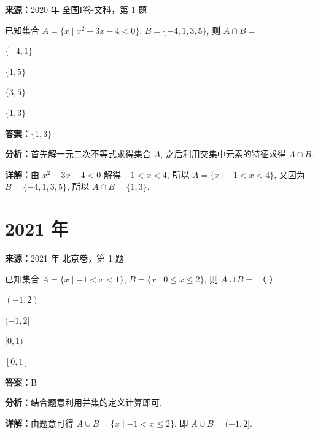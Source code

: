\begin{question}[points=5]
\textbf{来源：}2020 年 全国I卷-文科，第 1 题\par
已知集合 $A = \{x \mid x^2 - 3x - 4 < 0\}$, $B = \{-4, 1, 3, 5\}$, 则 $A \cap B =$
\begin{choices}
  \item $\{-4, 1\}$
  \item $\{1, 5\}$
  \item $\{3, 5\}$
  \item $\{1, 3\}$
\end{choices}
\begin{solution}
\textbf{答案：}$\{1, 3\}$

\textbf{分析：}首先解一元二次不等式求得集合 $A$, 之后利用交集中元素的特征求得 $A \cap B$.

\textbf{详解：}由 $x^2 - 3x - 4 < 0$ 解得 $-1 < x < 4$, 所以 $A = \{x \mid -1 < x < 4\}$, 又因为 $B = \{-4, 1, 3, 5\}$, 所以 $A \cap B = \{1, 3\}$.
\end{solution}
\end{question}

\section*{2021 年}

\begin{question}[points=4]
\textbf{来源：}2021 年 北京卷，第 1 题\par
已知集合 $A=\{x\mid -1<x<1\}$, $B=\{x\mid 0\leq x\leq 2\}$, 则 $A\cup B=$ （ ）
\begin{choices}
  \item $(-1,2)$
  \item $(-1,2]$
  \item $[0,1)$
  \item $[0,1]$
\end{choices}
\begin{solution}
\textbf{答案：}B

\textbf{分析：}结合题意利用并集的定义计算即可.

\textbf{详解：}由题意可得 $A\cup B=\{x\mid -1<x\leq 2\}$, 即 $A\cup B=(-1,2]$.
\end{solution}
\end{question}

